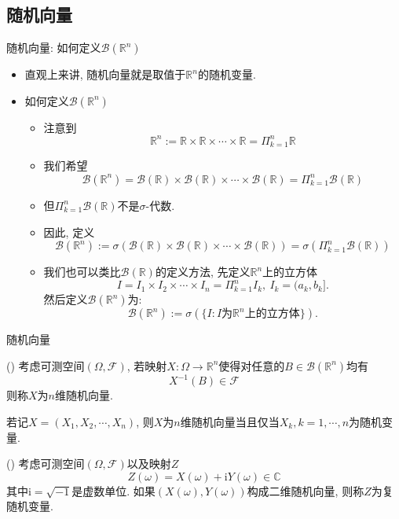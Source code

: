 \subsection{随机向量}

\begin{frame}{随机向量: 如何定义$\mathcal{B}(\mathbb{R}^n)$}
\begin{itemize}
	\item 直观上来讲, 随机向量就是取值于$\mathbb{R}^n$的随机变量.
	\item 如何定义$\mathcal{B}(\mathbb{R}^n)$
	\begin{itemize}[<+-|alert@+>]
		\item 注意到$$\mathbb{R}^n:=\mathbb{R}\times \mathbb{R}\times\cdots\times \mathbb{R}=\Pi_{k=1}^n\mathbb{R}$$
		\item 我们希望
		\[\mathcal{B}(\mathbb{R}^n)=\mathcal{B}(\mathbb{R})\times \mathcal{B}(\mathbb{R})\times\cdots\times\mathcal{B}(\mathbb{R})=\Pi_{k=1}^n\mathcal{B}(\mathbb{R})\]
		\item 但$\Pi_{k=1}^n\mathcal{B}(\mathbb{R})$不是$\sigma$-代数.
		\item 因此, 定义
		\[\mathcal{B}(\mathbb{R}^n):=\sigma(\mathcal{B}(\mathbb{R})\times \mathcal{B}(\mathbb{R})\times\cdots\times\mathcal{B}(\mathbb{R}))=\sigma(\Pi_{k=1}^n\mathcal{B}(\mathbb{R}))\]
		\item 我们也可以类比$\mathcal{B}(\mathbb{R})$的定义方法, 先定义$\mathbb{R}^n$上的立方体
		$$I=I_1\times I_2\times\cdots\times I_n=\Pi_{k=1}^nI_k, \ I_k=(a_k, b_k].$$ 然后定义$\mathcal{B}(\mathbb{R}^n)$为:
		\[\mathcal{B}(\mathbb{R}^n):=\sigma(\{I:I\mbox{为}\mathbb{R}^n\mbox{上的立方体}\}).\]%
	\end{itemize}

\end{itemize}

\end{frame}

\begin{frame}{随机向量}
\begin{defi}
() 考虑可测空间$(\Omega,\mathcal{F})$, 若映射$X: \Omega \rightarrow \mathbb{R}^{n}$使得对任意的$B \in \mathcal{B}(\mathbb{R}^{n})$均有
	\[
	X^{-1}(B) \in \mathcal{F}
	\]
则称$X$为$n$维随机向量.
\end{defi}
\pause
\begin{rmk}
若记$X=(X_1, X_2,\cdots, X_n)$, 则$X$为$n$维随机向量当且仅当$X_k, k=1,\cdots,n$为随机变量.
\end{rmk}

\pause
\begin{defi}
() 考虑可测空间$(\Omega,\mathcal{F})$以及映射$Z$
\[
Z(\omega)=X(\omega)+\mathrm{i} Y(\omega) \in \mathbb{C}
\]
其中$\mathrm{i}=\sqrt{-1}$是虚数单位. 如果$(X(\omega), Y(\omega))$构成二维随机向量, 则称$Z$为复随机变量.
\end{defi}

\end{frame}



